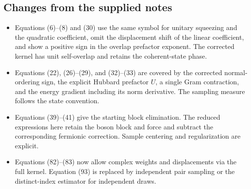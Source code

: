 \documentclass[../../main.tex]{subfiles}
\begin{document}
\subsection*{Changes from the supplied notes}
\begin{itemize}
 \item Equations (6)--(8) and (30) use the same symbol for unitary
 squeezing and the quadratic coefficient, omit the displacement
 shift of the linear coefficient, and show a positive sign in the overlap
 prefactor exponent. The corrected kernel has unit self-overlap
 and retains the coherent-state phase.
 \item Equations (22), (26)--(29), and (32)--(33) are covered by the
 corrected normal-ordering sign, the explicit Hubbard prefactor \(U\),
 a single Gram contraction, and the energy gradient including its
 norm derivative. The sampling measure follows the state convention.
 \item Equations (39)--(41) give the starting block elimination. The
 reduced expressions here retain the boson block and force and subtract
 the corresponding fermionic correction. Sample centering and
 regularization are explicit.
 \item Equations (82)--(83) now allow complex weights and displacements
 via the full kernel. Equation (93) is replaced by independent pair
 sampling or the distinct-index estimator for independent draws.
\end{itemize}
\end{document}
